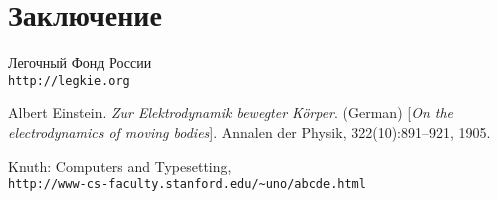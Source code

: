 \section{Заключение}
\newpage

\begin{thebibliography}{9}
Легочный Фонд России
\\\texttt{http://legkie.org}
 
Albert Einstein. 
\textit{Zur Elektrodynamik bewegter K{\"o}rper}. (German) 
[\textit{On the electrodynamics of moving bodies}]. 
Annalen der Physik, 322(10):891–921, 1905.
 
Knuth: Computers and Typesetting,
\\\texttt{http://www-cs-faculty.stanford.edu/\~{}uno/abcde.html}
\end{thebibliography}


